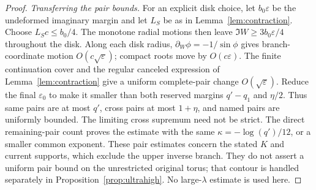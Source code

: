 \documentclass[11pt]{article}
\numberwithin{equation}{section}
\theoremstyle{definition}
\newcommand{\eps}{\varepsilon}
\begin{document}
\begin{proof}
\smallskip\noindent\textit{Transferring the pair bounds.}
For an explicit disk choice, let \(b_0\eps\) be the
undeformed imaginary margin and let \(L_S\) be as in
Lemma~\ref{lem:contraction}. Choose \(L_Sc\le b_0/4\).
The monotone radial motions then leave \(\Im W\ge3b_0\eps/4\)
throughout the disk. Along each disk radius,
\(\partial_W\phi=-1/\sin\phi\) gives branch-coordinate motion
\(O(c\sqrt\eps)\); compact roots move by \(O(c\eps)\).
The finite continuation cover and the regular canceled expression
of Lemma~\ref{lem:contraction} give a uniform complete-pair change
\(O(\sqrt\eps)\). Reduce the final \(\eps_0\) to make it
smaller than both reserved margins \(q'-q_1\) and \(\eta/2\).
Thus same pairs are at most \(q'\), cross pairs at most
\(1+\eta\), and named pairs are uniformly bounded.
The limiting cross supremum need not be strict. The direct
remaining-pair count proves the estimate with the same
\(\kappa=-\log(q')/12\), or a smaller common exponent.
These pair estimates concern the stated \(K\) and current
supports, which exclude the upper inverse branch. They do not
assert a uniform pair bound on the unrestricted original torus;
that contour is handled separately in Proposition~\ref{prop:ultrahigh}.
No large-\(\lambda\) estimate is used here.
\end{proof}
\end{document}
